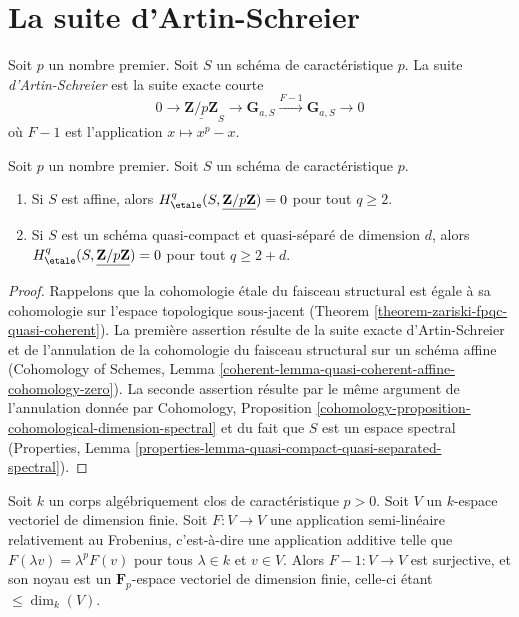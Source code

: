 \section{La suite d'Artin-Schreier}
\label{section-artin-schreier}

\noindent
Soit $p$ un nombre premier. Soit $S$ un sch\'ema de caract\'eristique $p$.
La suite {\it d'Artin-Schreier} est la suite exacte courte
$$
0 \longrightarrow \underline{\mathbf{Z}/p\mathbf{Z}}_S \longrightarrow
\mathbf{G}_{a, S} \xrightarrow{F-1} \mathbf{G}_{a, S} \longrightarrow 0
$$
o\`u $F - 1$ est l'application $x \mapsto x^p - x$.

\begin{lemma}
\label{lemma-vanishing-affine-char-p-p}
Soit $p$ un nombre premier. Soit $S$ un sch\'ema de caract\'eristique $p$.
\begin{enumerate}
\item Si $S$ est affine, alors
$H_\etale^q(S, \underline{\mathbf{Z}/p\mathbf{Z}}) = 0$ pour tout
$q \geq 2$.
\item Si $S$ est un sch\'ema quasi-compact et quasi-s\'epar\'e de
dimension $d$, alors $H_\etale^q(S, \underline{\mathbf{Z}/p\mathbf{Z}}) = 0$
pour tout $q \geq 2 + d$.
\end{enumerate}
\end{lemma}

\begin{proof}
Rappelons que la cohomologie \'etale du faisceau structural est \'egale
\`a sa cohomologie sur l'espace topologique sous-jacent
(Theorem \ref{theorem-zariski-fpqc-quasi-coherent}).
La premi\`ere assertion r\'esulte de la suite exacte d'Artin-Schreier
et de l'annulation de la cohomologie du faisceau structural sur un sch\'ema
affine (Cohomology of Schemes, Lemma
\ref{coherent-lemma-quasi-coherent-affine-cohomology-zero}).
La seconde assertion r\'esulte par le m\^eme argument de l'annulation
donn\'ee par Cohomology, Proposition
\ref{cohomology-proposition-cohomological-dimension-spectral}
et du fait que $S$ est un espace spectral
(Properties, Lemma
\ref{properties-lemma-quasi-compact-quasi-separated-spectral}).
\end{proof}

\begin{lemma}
\label{lemma-F-1}
Soit $k$ un corps alg\'ebriquement clos de caract\'eristique $p > 0$.
Soit $V$ un $k$-espace vectoriel de dimension finie. Soit $F : V \to V$
une application semi-lin\'eaire relativement au Frobenius, c'est-\`a-dire une application additive telle que
$F(\lambda v) = \lambda^p F(v)$ pour tous $\lambda \in k$ et $v \in V$.
Alors $F - 1 : V \to V$ est surjective, et son noyau est un
$\mathbf{F}_p$-espace vectoriel de dimension finie, celle-ci \'etant $\leq \dim_k(V)$.
\end{lemma}


